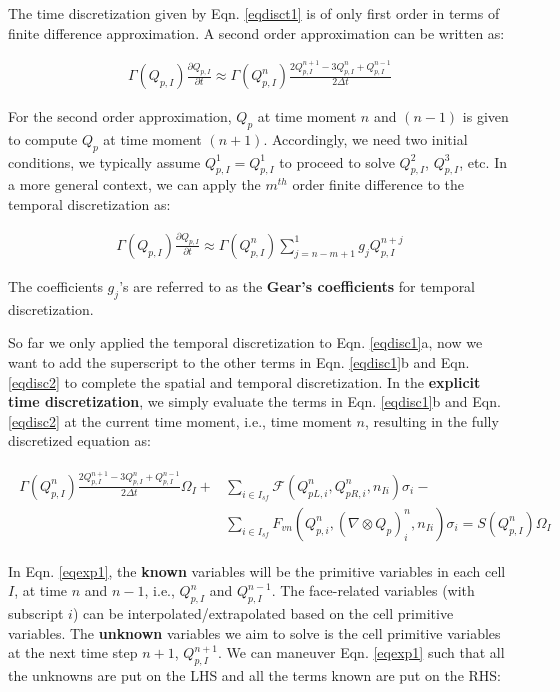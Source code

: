 \documentclass[12pt, letterpaper]{report}
\begin{document}
The time discretization given by Eqn. \ref{eqdisct1} is of only first order in terms of finite
difference approximation. A second order approximation can be written as:

\begin{align}\label{eqdisct2}
   \Gamma(Q_{p,I})\frac{\partial Q_{p,I}}{\partial t} \approx \Gamma(Q_{p,I}^n) \frac{2Q_{p,I}^{n+1} -
   3Q_{p,I}^n + Q_{p,I}^{n-1}}{2\Delta t}
\end{align}

For the second order approximation, $Q_p$ at time moment $n$ and $(n-1)$ is given to compute $Q_p$
at time moment $(n+1)$. Accordingly, we need two initial conditions, we typically assume $Q_{p,I}^1
= Q_{p,I}^1$ to proceed to solve $Q_{p,I}^2$, $Q_{p,I}^3$, etc. In a more general context, we can
apply the $m^{th}$ order finite difference to the temporal discretization as:

\begin{align*}
   \Gamma(Q_{p,I})\frac{\partial Q_{p,I}}{\partial t} \approx \Gamma(Q_{p,I}^n) \sum_{j=n-m+1}^{1}
   g_j Q_{p,I}^{n+j}
\end{align*}

The coefficients $g_j$'s are referred to as the {\bf Gear's coefficients} for temporal
discretization. \paraspace

So far we only applied the temporal discretization to Eqn. \ref{eqdisc1}a, now we want to add the
superscript to the other terms in Eqn. \ref{eqdisc1}b and Eqn. \ref{eqdisc2} to complete the
spatial and temporal discretization. In the {\bf explicit time discretization}, we simply evaluate the
terms in Eqn. \ref{eqdisc1}b and Eqn. \ref{eqdisc2} at the current time moment, i.e., time moment
$n$, resulting in the fully discretized equation as:

\begin{align}\label{eqexp1}
   \begin{split}
      \Gamma(Q_{p,I}^n) \frac{2Q_{p,I}^{n+1} - 3Q_{p,I}^n + Q_{p,I}^{n-1}}{2\Delta t} \Omega_I +
      &\sum_{i \in I_{sf}} \mathcal{F}(Q_{pL,i}^n, Q_{pR,i}^n, n_{Ii}) \sigma_i - \\ &\sum_{i \in
      I_{sf}} F_{vn}(Q_{p,i}^n, (\nabla \mathop{\otimes} Q_p)_i^n, n_{Ii}) \sigma_i = S(Q_{p,I}^n)
      \Omega_I
   \end{split}
\end{align}

In Eqn. \ref{eqexp1}, the {\bf known} variables will be the primitive variables in each cell $I$,
at time $n$ and $n-1$, i.e., $Q_{p,I}^n$ and $Q_{p,I}^{n-1}$. The face-related variables (with
subscript $i$) can be interpolated/extrapolated based on the cell primitive variables. The {\bf
unknown} variables we aim to solve is the cell primitive variables at the next time step $n+1$,
$Q_{p,I}^{n+1}$. We can maneuver Eqn. \ref{eqexp1} such that all the unknowns are put on the LHS and
all the terms known are put on the RHS:
\end{document}
